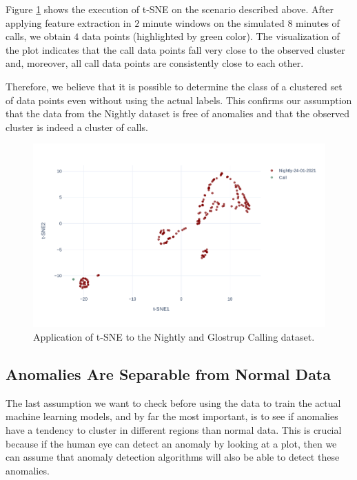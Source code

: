 Figure \ref{fig:tsne-nightly-calls} shows the execution of t-SNE on the scenario described above. After applying feature extraction in $2$ minute windows on the simulated $8$ minutes of calls, we obtain $4$ data points (highlighted by green color). The visualization of the plot indicates that the call data points fall very close to the observed cluster and, moreover, all call data points are consistently close to each other. 

Therefore, we believe that it is possible to determine the class of a clustered set of data points even without using the actual labels. This confirms our assumption that the data from the Nightly dataset is free of anomalies and that the observed cluster is indeed a cluster of calls.

\begin{figure}[h]
    \centering
    \includegraphics[width=\textwidth]{img/tsne-nights-call-comparison.pdf}
    \caption{Application of t-SNE to the Nightly and Glostrup Calling dataset.}
    \label{fig:tsne-nightly-calls}
\end{figure}

\subsection{Anomalies Are Separable from Normal Data}
\label{assumption-anomalies}
The last assumption we want to check before using the data to train the actual machine learning models, and by far the most important, is to see if anomalies have a tendency to cluster in different regions than normal data. This is crucial because if the human eye can detect an anomaly by looking at a plot, then we can assume that anomaly detection algorithms will also be able to detect these anomalies. 


